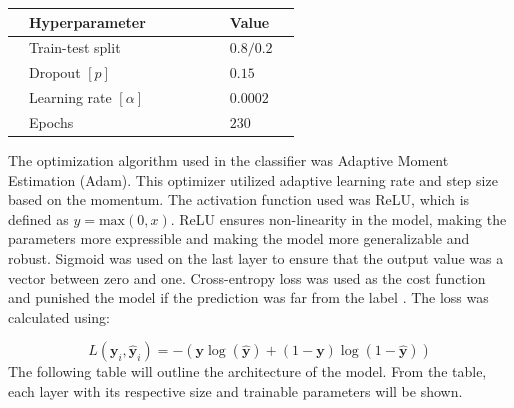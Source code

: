 \documentclass[11pt, fleqn, titlepage]{article}
\newcommand{\1}[1]{\mathds{1}\left[#1\right]}
\begin{document}
	\begin{table}[H]\label{hyperparams}
		\centering
		\begin{tabular}{l l l l l l l l l}
			\toprule
			& \textbf{Hyperparameter}           &&&&& & \textbf{Value}    & \\ \midrule
			& Train-test split         &&&&& & $0.8/0.2$& \\
			& Dropout $[p]$            &&&&& & $0.15$    & \\ 
			& Learning rate $[\alpha]$ &&&&& & $0.0002$  & \\ 
			& Epochs                   &&&&& & $230$    & \\  \bottomrule
		\end{tabular}
	\end{table}
	
	 \noindent
	 The optimization algorithm used in the classifier was Adaptive Moment Estimation (Adam). This optimizer utilized adaptive learning rate and step size based on the momentum. The activation function used was ReLU, which is defined as $ y = \text{max}(0,x) $. ReLU ensures non-linearity in the model, making the parameters more expressible and making the model more generalizable and robust. Sigmoid was used on the last layer to ensure that the output value was a vector between zero and one. Cross-entropy loss was used as the cost function and punished the model if the prediction was far from the label \cite {dl}. The loss was calculated using:
	 
	\begin{equation*}\label{key}
		L\left(\boldsymbol{y}_{i}, \hat{\boldsymbol{y}}_{i}\right) = -(\mathbf y \log (\mathbf {\hat y})+(1-\mathbf  y) \log (1-\mathbf {\hat y}))
	\end{equation*}
	\noindent
	The following table will outline the architecture of the model. From the table, each layer with its respective size and trainable parameters will be shown.
	
\end{document}
